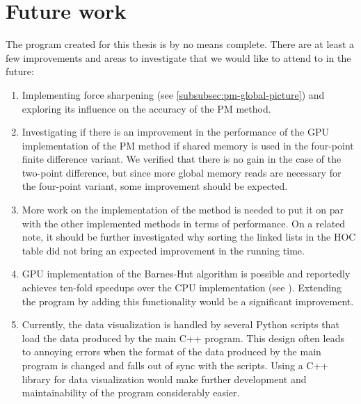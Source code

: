 \section{Future work}
The program created for this thesis is by no means complete.
There are at least a few improvements and areas to investigate that we would like to attend to in the future:
\begin{enumerate}
      \item Implementing force sharpening (see \autoref{subsubsec:pm-global-picture}) and exploring its influence on the accuracy of the PM method.
      \item Investigating if there is an improvement in the performance of the GPU implementation of the PM method if shared memory is used in the four-point finite difference variant.
            We verified that there is no gain in the case of the two-point difference, but since more global memory reads are necessary for the four-point variant, some improvement should be expected.
      \item More work on the implementation of the \PThreeM{} method is needed to put it on par with the other implemented methods in terms of performance. On a related note, it should be further investigated why sorting the linked lists in the HOC table did not bring an expected improvement in the running time.
      \item GPU implementation of the Barnes-Hut algorithm is possible and reportedly achieves ten-fold speedups over the CPU implementation (see \cite{BURTSCHER201175}).
            Extending the program by adding this functionality would be a significant improvement.
      \item Currently, the data visualization is handled by several Python scripts that load the data produced by the main C++ program.
            This design often leads to annoying errors when the format of the data produced by the main program is changed and falls out of sync with the scripts.
            Using a C++ library for data visualization would make further development and maintainability of the program considerably easier.
\end{enumerate}